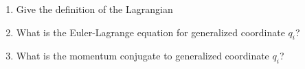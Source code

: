 

\vspace*{\fill}
\centering

\begin{enumerate}
    \item Give the definition of the Lagrangian
    \item What is the Euler-Lagrange equation for generalized coordinate $q_{i}$?
    \item What is the momentum conjugate to generalized coordinate $q_{i}$?
\end{enumerate}

\centering
\vspace*{\fill}

